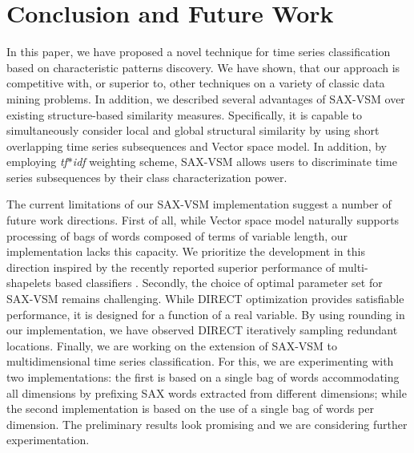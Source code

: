 \documentclass{llncs}
\begin{document}
\section{Conclusion and Future Work}
In this paper, we have proposed a novel technique for time series classification based on 
characteristic patterns discovery. We have shown, that our approach is competitive with, 
or superior to, other techniques on a variety of classic data mining problems. In addition, 
we described several advantages of SAX-VSM over existing structure-based similarity measures.
Specifically, it is capable to simultaneously consider local and global structural similarity by 
using short overlapping time series subsequences and Vector space model. 
In addition, by employing \textit{tf$\ast$idf} weighting scheme, SAX-VSM allows users to 
discriminate time series subsequences by their class characterization power.

The current limitations of our SAX-VSM implementation suggest a number of future work directions. 
First of all, while Vector space model naturally supports processing of bags of words composed 
of terms of variable length, our implementation lacks this capacity. We prioritize the development in 
this direction inspired by the recently reported superior performance of multi-shapelets based
classifiers \cite{bagnal}.
Secondly, the choice of optimal parameter set for SAX-VSM remains challenging.
While DIRECT optimization provides satisfiable performance, it is designed for a function of a real 
variable. By using rounding in our implementation, we have observed DIRECT iteratively sampling 
redundant locations. 
Finally, we are working on the extension of SAX-VSM to multidimensional time series classification.
For this, we are experimenting with two implementations: the first is based on a single bag of words
accommodating all dimensions by prefixing SAX words extracted from different dimensions;
while the second implementation is based on the use of a single bag of words per dimension.
The preliminary results look promising and we are considering further experimentation.
\end{document}
